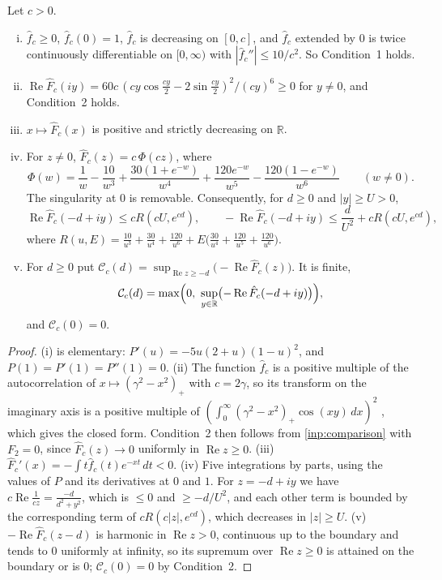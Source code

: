 \documentclass[11pt]{amsart}
\numberwithin{equation}{section}
\theoremstyle{plain}
\theoremstyle{definition}
\theoremstyle{remark}
\newcommand{\RR}{\mathbb{R}}
\renewcommand{\Re}{\operatorname{Re}}
\newcommand{\1}{\mathbf{1}}
\begin{document}
\begin{lemma}\label{lem:parabolic}
Let $c>0$.
\begin{enumerate}[(i)]
  \item $\hat f_c\ge0$, $\hat f_c(0)=1$, $\hat f_c$ is decreasing on $[0,c]$, and $\hat f_c$ extended by
    $0$ is twice continuously differentiable on $[0,\infty)$ with $|\hat f_c''|\le10/c^2$. So
    Condition~1 holds.
  \item $\Re\hat F_c(iy)=60c\,(cy\cos\frac{cy}2-2\sin\frac{cy}2)^2/(cy)^6\ge0$ for $y\ne0$, and
    Condition~2 holds.
  \item $x\mapsto\hat F_c(x)$ is positive and strictly decreasing on $\RR$.
  \item For $z\ne0$, $\hat F_c(z)=c\,\Phi(cz)$, where
    \[
      \Phi(w)=\frac1w-\frac{10}{w^3}+\frac{30(1+e^{-w})}{w^4}
        +\frac{120e^{-w}}{w^5}-\frac{120(1-e^{-w})}{w^6}\qquad(w\ne0).
    \]
    The singularity at $0$ is removable. Consequently, for $d\ge0$ and $|y|\ge U>0$,
    \[
      \Re\hat F_c(-d+iy)\le cR(cU,e^{cd}),\qquad-\Re\hat F_c(-d+iy)\le\frac d{U^2}+cR(cU,e^{cd}),
    \]
    where $R(u,E)=\frac{10}{u^3}+\frac{30}{u^4}+\frac{120}{u^6}+E\bigl(\frac{30}{u^4}+\frac{120}{u^5}+\frac{120}{u^6}\bigr)$.
  \item For $d\ge0$ put $\mathcal C_c(d)=\sup_{\Re z\ge-d}\bigl(-\Re\hat F_c(z)\bigr)$. It is finite,
    \[
      \mathcal C_c(d)=\max\Bigl(0,\ \sup_{y\in\RR}\bigl(-\Re\hat F_c(-d+iy)\bigr)\Bigr),
    \]
    and $\mathcal C_c(0)=0$.
\end{enumerate}
\end{lemma}

\begin{proof}
(i) is elementary: $P'(u)=-5u(2+u)(1-u)^2$, and $P(1)=P'(1)=P''(1)=0$. (ii) The function
$\hat f_c$ is a positive multiple of the autocorrelation of $x\mapsto(\gamma^2-x^2)_+$ with $c=2\gamma$, so
its transform on the imaginary axis is a positive multiple of $(\int_0^\infty(\gamma^2-x^2)_+\cos(xy)\,dx)^2$
\cite[Lemma~3.6]{Xylouris2011nullstellen}, which gives the closed form. Condition~2 then follows from
\cref{inp:comparison} with $F_2=0$, since $\hat F_c(z)\to0$ uniformly in $\Re z\ge0$. (iii)
$\hat F_c'(x)=-\int t\hat f_c(t)e^{-xt}\,dt<0$. (iv) Five integrations by parts, using the values of
$P$ and its derivatives at $0$ and $1$. For $z=-d+iy$ we have $c\Re\frac1{cz}=\frac{-d}{d^2+y^2}$, which is
$\le0$ and $\ge-d/U^2$, and each other term is bounded by the corresponding term of $cR(c|z|,e^{cd})$,
which decreases in $|z|\ge U$. (v) $-\Re\hat F_c(z-d)$ is harmonic in $\Re z>0$, continuous up to the
boundary and tends to $0$ uniformly at infinity, so its supremum over $\Re z\ge0$ is attained on
the boundary or is $0$; $\mathcal C_c(0)=0$ by Condition~2.
\end{proof}
\end{document}
